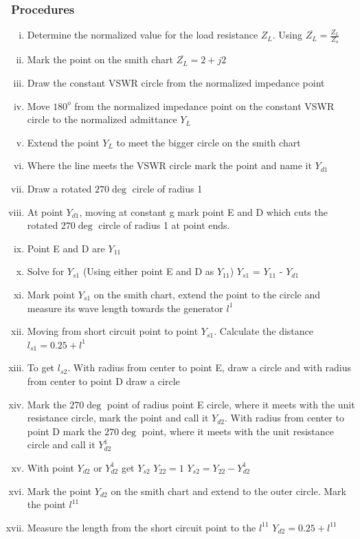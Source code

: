 \begin{enumerate}[(i)]
\begin{exmp}
\subsubsection*{Procedures}
\begin{enumerate}[(i)]
\item Determine the normalized value for the load resistance $Z_{L}$. Using $\overline{Z_{L}} = \frac{Z_{L}}{Z_{o}}$ 
\item Mark the point on the smith chart $\overline{Z_{L}} = 2 + j2$   
\item Draw the constant VSWR circle from the normalized impedance point
\item Move $180^{o}$ from the normalized impedance point on the constant VSWR circle to the normalized admittance $Y_{L}$
\item Extend the point $Y_{L}$ to meet the bigger circle on the smith chart 
\item Where the line meets the VSWR circle mark the point and name it $Y_{d1}$                       
\item Draw a rotated $270\deg $ circle of radius 1                                                  
\item At point $Y_{d1}$, moving at constant g mark point E and D which cuts the rotated $270\deg $ circle of radius 1 at point ends.
\item Point E and D are $Y_{11}$                                                
\item Solve for $Y_{s1}$ (Using either point E and D as $Y_{11}$) $Y_{s1}$ =    $Y_{11}$ -    $Y_{d1}$                     
\item Mark point $Y_{s1}$ on the smith chart, extend the point to the circle and measure its wave length  towards the generator $l^{1}$ 
\item Moving from short circuit point to point $Y_{s1}$. Calculate the distance
$ l_{s1} = 0.25 + l^{1} $                                                                        
\item To get $l_{s2}$. With radius from center to point E, draw a circle and with radius from center to point D draw a circle
\item Mark the $270\deg$ point of radius point E circle, where it meets with the unit resistance circle, mark the point and call it $Y_{d2}$. With radius from center to point D mark the $270\deg$ point, where it meets with the unit resistance circle and call it $Y_{d2}^{1}$ 
\item With point $Y_{d2}$ or $Y_{d2}^{1}$ get $Y_{s2}$ $Y_{22}=1$ $Y_{s2}=Y_{22}-Y_{d2}^{1}$
\item Mark the point $Y_{d2}$ on the smith chart and extend to the outer circle. Mark the point $l^{11}$
\item Measure the length from the short circuit point to the $l^{11}$ $Y_{d2} = 0.25 + l^{11}$
\end{enumerate}
\end{exmp}


\end{enumerate}
